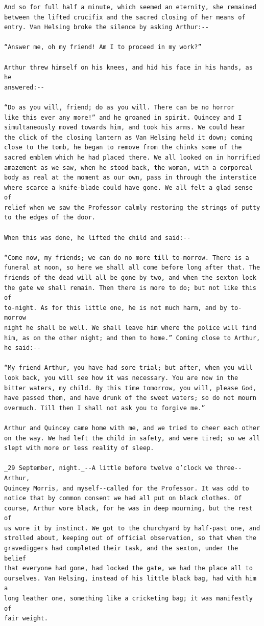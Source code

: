 \documentclass{article}
\begin{document}
\begin{verbatim}
And so for full half a minute, which seemed an eternity, she remained
between the lifted crucifix and the sacred closing of her means of
entry. Van Helsing broke the silence by asking Arthur:--

“Answer me, oh my friend! Am I to proceed in my work?”

Arthur threw himself on his knees, and hid his face in his hands, as he
answered:--

“Do as you will, friend; do as you will. There can be no horror
like this ever any more!” and he groaned in spirit. Quincey and I
simultaneously moved towards him, and took his arms. We could hear
the click of the closing lantern as Van Helsing held it down; coming
close to the tomb, he began to remove from the chinks some of the
sacred emblem which he had placed there. We all looked on in horrified
amazement as we saw, when he stood back, the woman, with a corporeal
body as real at the moment as our own, pass in through the interstice
where scarce a knife-blade could have gone. We all felt a glad sense of
relief when we saw the Professor calmly restoring the strings of putty
to the edges of the door.

When this was done, he lifted the child and said:--

“Come now, my friends; we can do no more till to-morrow. There is a
funeral at noon, so here we shall all come before long after that. The
friends of the dead will all be gone by two, and when the sexton lock
the gate we shall remain. Then there is more to do; but not like this of
to-night. As for this little one, he is not much harm, and by to-morrow
night he shall be well. We shall leave him where the police will find
him, as on the other night; and then to home.” Coming close to Arthur,
he said:--

“My friend Arthur, you have had sore trial; but after, when you will
look back, you will see how it was necessary. You are now in the
bitter waters, my child. By this time tomorrow, you will, please God,
have passed them, and have drunk of the sweet waters; so do not mourn
overmuch. Till then I shall not ask you to forgive me.”

Arthur and Quincey came home with me, and we tried to cheer each other
on the way. We had left the child in safety, and were tired; so we all
slept with more or less reality of sleep.

_29 September, night._--A little before twelve o’clock we three--Arthur,
Quincey Morris, and myself--called for the Professor. It was odd to
notice that by common consent we had all put on black clothes. Of
course, Arthur wore black, for he was in deep mourning, but the rest of
us wore it by instinct. We got to the churchyard by half-past one, and
strolled about, keeping out of official observation, so that when the
gravediggers had completed their task, and the sexton, under the belief
that everyone had gone, had locked the gate, we had the place all to
ourselves. Van Helsing, instead of his little black bag, had with him a
long leather one, something like a cricketing bag; it was manifestly of
fair weight.


\end{verbatim}
\end{document}
